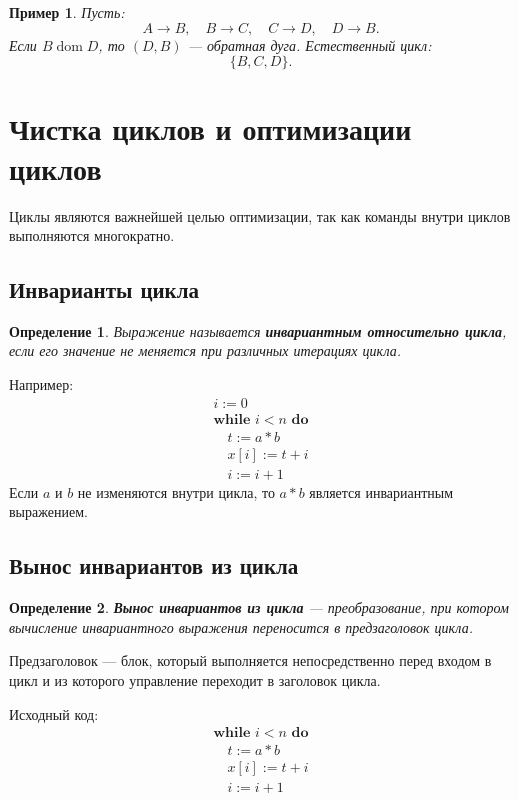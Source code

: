 \documentclass[12pt,a4paper]{article}
\newtheorem{definition}{Определение}
\newtheorem{example}{Пример}
\DeclareMathOperator{\dom}{dom}
\begin{document}
\begin{example}
Пусть:
\[
A\to B,\quad B\to C,\quad C\to D,\quad D\to B.
\]
Если $B\dom D$, то $(D,B)$ --- обратная дуга. Естественный цикл:
\[
\{B,C,D\}.
\]
\end{example}

\section{Чистка циклов и оптимизации циклов}

Циклы являются важнейшей целью оптимизации, так как команды внутри циклов выполняются многократно.

\subsection{Инварианты цикла}

\begin{definition}
Выражение называется \textbf{инвариантным относительно цикла}, если его значение не меняется при различных итерациях цикла.
\end{definition}

Например:
\[
\begin{array}{l}
i := 0\\
\textbf{while } i<n \textbf{ do}\\
\quad t := a*b\\
\quad x[i] := t+i\\
\quad i := i+1
\end{array}
\]
Если $a$ и $b$ не изменяются внутри цикла, то $a*b$ является инвариантным выражением.

\subsection{Вынос инвариантов из цикла}

\begin{definition}
\textbf{Вынос инвариантов из цикла} --- преобразование, при котором вычисление инвариантного выражения переносится в предзаголовок цикла.
\end{definition}

Предзаголовок --- блок, который выполняется непосредственно перед входом в цикл и из которого управление переходит в заголовок цикла.

Исходный код:
\[
\begin{array}{l}
\textbf{while } i<n \textbf{ do}\\
\quad t := a*b\\
\quad x[i] := t+i\\
\quad i := i+1
\end{array}
\]
\end{document}
